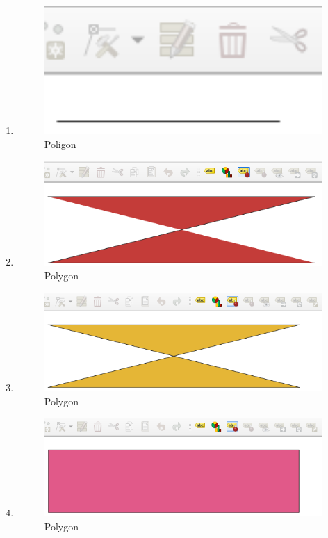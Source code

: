 \begin{enumerate}
	\item 
	
	\begin{figure}[H]
		\includegraphics[width=12cm]{figures/1174059/Python1/soal6.PNG}
		\centering
		\caption{Poligon}
	\end{figure}
	
	\item 
	
	\begin{figure}[H]
		\includegraphics[width=12cm]{figures/1174059/Python1/soal7.PNG}
		\centering
		\caption{Polygon}
	\end{figure}
	
	\item 
	
	\begin{figure}[H]
		\includegraphics[width=12cm]{figures/1174059/Python1/soal8.PNG}
		\centering
		\caption{Polygon}
	\end{figure}
	
	\item 
	
	\begin{figure}[H]
		\includegraphics[width=12cm]{figures/1174059/Python1/soal9.PNG}
		\centering
		\caption{Polygon}
	\end{figure}


\end{enumerate}
